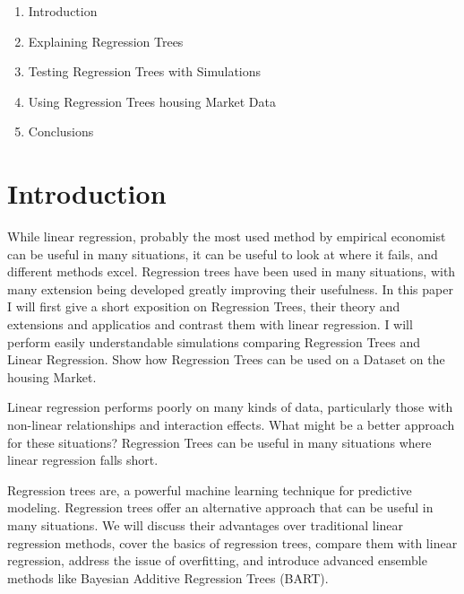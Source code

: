 \documentclass[12pt]{article}
\begin{document}
\onehalfspacing                  	




\begin{enumerate}
    \item Introduction
    \item Explaining Regression Trees
    \item Testing Regression Trees with Simulations
    \item Using Regression Trees housing Market Data
    \item Conclusions
\end{enumerate}


\section{Introduction}
While linear regression, probably the most used method by empirical economist can be useful in many situations, it can be useful to look at where it fails, and different methods excel. Regression trees have been used in many situations, with many extension being developed greatly improving their usefulness. In this paper I will first give a short exposition on Regression Trees, their theory and extensions and applicatios and contrast them with linear regression. I will perform easily understandable simulations comparing Regression Trees and Linear Regression. Show how Regression Trees can be used on a Dataset on the housing Market.



Linear regression performs poorly on many kinds of data, particularly those with non-linear relationships and interaction effects. What might be a better approach for these situations? Regression Trees can be useful in many situations where linear regression falls short.

Regression trees are, a powerful machine learning technique for predictive modeling. Regression trees offer an alternative approach that can be useful in many situations. We will discuss their advantages over traditional linear regression methods, cover the basics of regression trees, compare them with linear regression, address the issue of overfitting, and introduce advanced ensemble methods like Bayesian Additive Regression Trees (BART).
\end{document}
